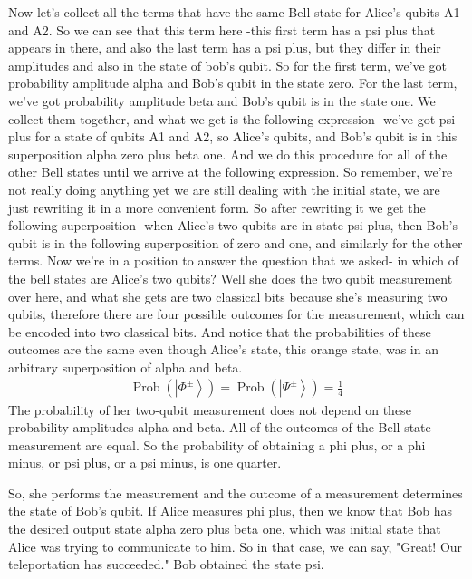 Now let's collect all the terms that have the same Bell state for Alice's qubits A1 and A2. So we can see that this term here -this first term has a psi plus that appears in there, and also the last term has a psi plus, but they differ in their amplitudes and also in the state of bob's qubit. So for the first term, we've got probability amplitude alpha and Bob's qubit in the state zero. For the last term, we've got probability amplitude beta and Bob's qubit is in the state one. We collect them together, and what we get is the following expression- we've got psi plus for a state of qubits A1 and A2, so Alice's qubits, and Bob's qubit is in this superposition alpha zero plus beta one. And we do this procedure for all of the other Bell states until we arrive at the following expression. So remember, we're not really doing anything yet we are still dealing with the initial state, we are just rewriting it in a more convenient form. So after rewriting it we get the following superposition- when Alice's two qubits are in state psi plus, then Bob's qubit is in the following superposition of zero and one, and similarly for the other terms. Now we're in a position to answer the question that we asked- in which of the bell states are Alice's two qubits? Well she does the two qubit measurement over here, and what she gets are two classical bits because she's measuring two qubits, therefore there are four possible outcomes for the measurement, which can be encoded into two classical bits. And notice that the probabilities of these outcomes are the same even though Alice's state, this orange state, was in an arbitrary superposition of alpha and beta.
\begin{align}
\operatorname{Prob}\left(\left|\Phi^{\pm}\right\rangle\right)=\operatorname{Prob}\left(\left|\Psi^{\pm}\right\rangle\right)=\frac{1}{4}
\end{align}
The probability of her two-qubit measurement does not depend on these probability amplitudes alpha and beta. All of the outcomes of the Bell state measurement are equal. So the probability of obtaining a phi plus, or a phi minus, or psi plus, or a psi minus, is one quarter.

So, she performs the measurement and the outcome of a measurement determines the state of Bob's qubit. If Alice measures phi plus, then we know that Bob has the desired output state alpha zero plus beta one, which was initial state that Alice was trying to communicate to him. So in that case, we can say, "Great! Our teleportation has succeeded." Bob obtained the state psi.

